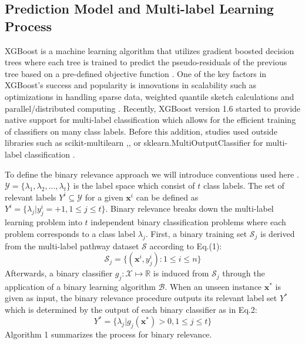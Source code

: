 \documentclass[sn-mathphys,Numbered]{sn-jnl}%
\theoremstyle{thmstyleone}%
\theoremstyle{thmstyletwo}%
\theoremstyle{thmstylethree}%
\begin{document}
\subsection{Prediction Model and Multi-label Learning Process}
XGBoost is a machine learning algorithm that utilizes gradient boosted decision trees  \cite{friedmanGreedyFunctionApproximation2001} where each tree is trained to predict the pseudo-residuals of the previous tree based on a pre-defined objective function \cite{sagiApproximatingXGBoostInterpretable2021}.
One of the key factors in XGBoost's success and popularity is innovations in scalability such as optimizations in handling sparse data, weighted quantile sketch calculations and parallel/distributed computing \cite{chenXGBoostScalableTree2016}.
Recently, XGBoost version 1.6 started to provide native support for multi-label classification which allows for the efficient training of classifiers on many class labels.
Before this addition, studies used outside libraries such as scikit-multilearn \cite{10.5555/3322706.3322712},\cite{chenPredictingCharacterisingPersuasion2023},\cite{zhangRapidAntibioticResistance2022} or sklearn.MultiOutputClassifier for multi-label classification \cite{piter2021multi}.

To define the binary relevance approach we will introduce conventions used here \cite{zhangBinaryRelevanceMultilabel2018}.
$\mathcal{Y}=\{\lambda_1,\lambda_2,...,\lambda_t\}$ is the label space which consist of $t$ class labels.
The set of relevant labels $Y^{i} \subseteq \mathcal{Y}$ for a given $\textbf{x}^{i}$ can be defined as $Y^{i} =\{\lambda_j | y^{i}_j = +1, 1 \leqslant j \leqslant t\}$.
Binary relevance breaks down the multi-label learning problem into $t$ independent binary classification problems where each problem corresponds to a class label $\lambda_j$.
First, a binary training set $\mathcal{S}_j$ is derived from the multi-label pathway dataset $\mathcal{S}$ according to Eq.(1):
\begin{equation}
\mathcal{S}_j=\{(\textbf{x}^{i}, y^{i}_j) : 1 \leqslant i \leqslant n \}
\end{equation}
Afterwards, a binary classifier $g_j : \mathcal{X} \mapsto \mathbb{R}$ is induced from $\mathcal{S}_j$ through the application of a binary learning algorithm $\mathcal{B}$.
When an unseen instance $\textbf{x}^*$ is given as input, the binary relevance procedure outputs its relevant label set $Y^*$ which is determined by the output of each binary classifier as in Eq.2:
\begin{equation}
Y^*=\{ \lambda_j | g_j(\textbf{x}^*) > 0, 1 \leqslant j \leqslant t \}
\end{equation}
Algorithm 1 summarizes the process for binary relevance.
\end{document}
